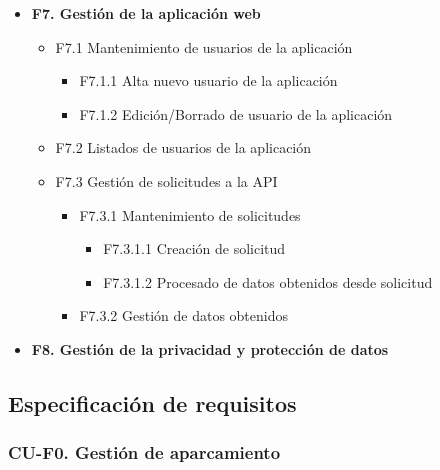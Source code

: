 \documentclass[12pt,a4paper]{article}
\begin{document}
\begin{itemize}
\begin{itemize}
\begin{itemize}
			\end{itemize}
			\item F6.4 Listados de alertas
		\end{itemize}
		\item \textbf{F7. Gestión de la aplicación web}
		\begin{itemize}
			\item F7.1 Mantenimiento de usuarios de la aplicación
			\begin{itemize}
				\item F7.1.1 Alta nuevo usuario de la aplicación
				\item F7.1.2 Edición/Borrado de usuario de la aplicación
			\end{itemize}
			\item F7.2 Listados de usuarios de la aplicación
			\item F7.3 Gestión de solicitudes a la API
			\begin{itemize}
				\item F7.3.1 Mantenimiento de solicitudes
				\begin{itemize}
					\item F7.3.1.1 Creación de solicitud
					\item F7.3.1.2 Procesado de datos obtenidos desde solicitud
				\end{itemize}
				\item F7.3.2 Gestión de datos obtenidos
			\end{itemize}
		\end{itemize}
		\item \textbf{F8. Gestión de la privacidad y protección de datos}
	\end{itemize}
	
	\clearpage
	
	\subsection{Especificación de requisitos}
	
	\subsubsection{CU-F0. Gestión de aparcamiento}
	
\end{document}
